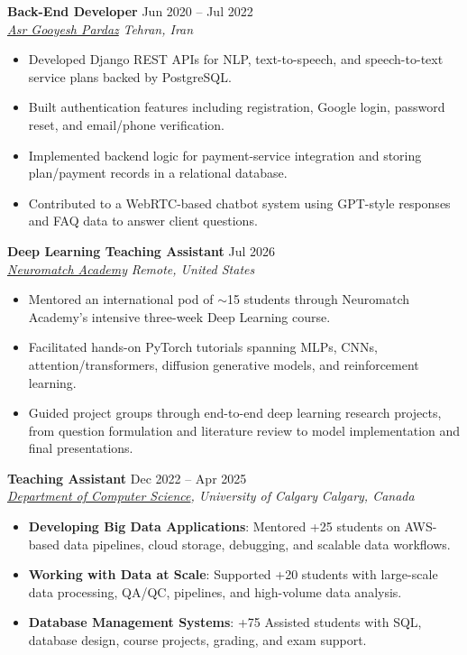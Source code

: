 \documentclass[a4paper,10pt]{article}
\newcommand{\resumeSubheading}[4]{
    \textbf{#1} \hfill #2 \\
    \textit{#3} \hfill \textit{#4}
}
\begin{document}
\resumeSubheading
{Back-End Developer}
{Jun 2020 -- Jul 2022}
{\href{https://asr-gooyesh.com/en/}{Asr Gooyesh Pardaz}}
{Tehran, Iran}
\begin{itemize}[leftmargin=0.25in]
    \item Developed Django REST APIs for NLP, text-to-speech, and speech-to-text service plans backed by PostgreSQL.
    \item Built authentication features including registration, Google login, password reset, and email/phone verification.
    \item Implemented backend logic for payment-service integration and storing plan/payment records in a relational database.
    \item Contributed to a WebRTC-based chatbot system using GPT-style responses and FAQ data to answer client questions.
\end{itemize}

\resumeSubheading
{Deep Learning Teaching Assistant}
{Jul 2026}
{\href{https://neuromatch.io/}{Neuromatch Academy}}
{Remote, United States}
\begin{itemize}[leftmargin=0.25in]
    \item Mentored an international pod of $\sim$15 students through Neuromatch Academy's intensive three-week Deep Learning course.
    \item Facilitated hands-on PyTorch tutorials spanning MLPs, CNNs, attention/transformers, diffusion generative models, and reinforcement learning.
    \item Guided project groups through end-to-end deep learning research projects, from question formulation and literature review to model implementation and final presentations.
\end{itemize}

\resumeSubheading
{Teaching Assistant}
{Dec 2022 -- Apr 2025}
{\href{https://science.ucalgary.ca/computer-science} {Department of Computer Science}, University of Calgary}
{Calgary, Canada}
\begin{itemize}[leftmargin=0.25in]
    \item \textbf{Developing Big Data Applications}: Mentored +25 students on AWS-based data pipelines, cloud storage, debugging, and scalable data workflows. 
    \item \textbf{Working with Data at Scale}: Supported +20 students with large-scale data processing, QA/QC, pipelines, and high-volume data analysis. 
    \item \textbf{Database Management Systems}: +75 Assisted students with SQL, database design, course projects, grading, and exam support.
\end{itemize}
\end{document}
